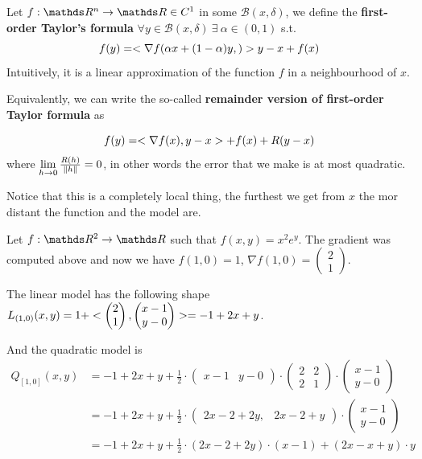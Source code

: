 \documentclass[computationalMathematics.tex]{subfiles}
\begin{document}
\begin{definition}
Let $f : \R^n \to \R \in C^1$ in some $\mathcal{B}(x, \delta)$, we define the \textbf{first-order Taylor's formula}  $\forall y \in \mathcal{B}(x, \delta)~\exists ~ \alpha \in (0, 1)$ s.t.
\[
  f(y) = <\nabla f(\alpha x + (1 - \alpha) y, )> {y - x} + f(x)
\]
Intuitively, it is a linear approximation of the function $f$ in a neighbourhood of $x$. 

  Equivalently, we can write the so-called \textbf{remainder version of first-order Taylor formula} as

\[
  f(y) = <\nabla f(x), y - x> + f(x)+ R(y - x)
\]
  where $\lim\limits_{h \to 0} \frac{R(h)}{\left\lVert h\right\rVert} = 0$, in other words the error that we make is at most quadratic.
\end{definition}

Notice that this is a completely local thing, the furthest we get from $x$ the mor distant the function and the model are.

\begin{example}
Let $f:\R^2 \to \R$ such that $f(x, y) = x^2 e^y$. The gradient was computed above and now we have $f(1, 0) = 1$, $\nabla f(1, 0) = \begin{pmatrix}2\\1\end{pmatrix}$.

The linear model has the following shape $L_{(1, 0)} (x, y) = 1 + <\begin{pmatrix}2\\ 1\end{pmatrix}, \begin{pmatrix} x-1\\ y-0\end{pmatrix}> = -1 + 2x + y$.

And the quadratic model is 
  \begin{equation}
    \begin{split}
      Q_{[1, 0]} (x, y) &= -1 + 2x + y + \frac{1}{2} \cdot \begin{pmatrix}x-1 & y-0\end{pmatrix} \cdot \begin{pmatrix} 2 & 2\\ 2 & 1 \end{pmatrix} \cdot \begin{pmatrix} x-1 \\ y-0 \end{pmatrix}\\ 
      &= -1 +2x + y + \frac{1}{2} \cdot \begin{pmatrix} 2x -2 +2y, & 2x -2 +y \end{pmatrix} \cdot \begin{pmatrix} x-1\\ y-0\end{pmatrix}\\
      &= -1 + 2x + y + \frac{1}{2} \cdot (2x -2 + 2y) \cdot (x-1)  + (2x -x +y) \cdot y
    \end{split}
    \end{equation}
\end{example}
\end{document}
